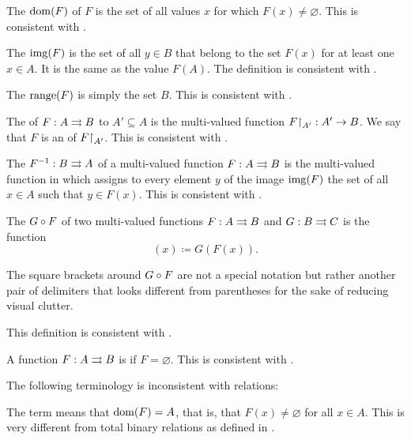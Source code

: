 \begin{definition}
\begin{thmenum}[resume=def:multi_valued_function]
     The  \( \operatorname{dom}(F) \) of \( F \) is the set of all values \( x \) for which \( F(x) \neq \varnothing \). This is consistent with .

     The  \( \operatorname{img}(F) \) is the set of all \( y \in B \) that belong to the set \( F(x) \) for at least one \( x \in A \). It is the same as the value \( F(A) \). The definition is consistent with .

     The  \( \operatorname{range}(F) \) is simply the set \( B \). This is consistent with .

     The  of \( F: A \rightrightarrows B \) to \( A' \subseteq A \) is the multi-valued function \( F{\upharpoonright}_{A'}: A' \rightarrow B \). We say that \( F \) is an  of \( F{\upharpoonright}_{A'} \). This is consistent with .

     The  \( F^{-1}: B \rightrightarrows A \) of a multi-valued function \( F: A \rightrightarrows B \) is the multi-valued function in which assigns to every element \( y \) of the image \( \operatorname{img}(F) \) the set of all \( x \in A \) such that \( y \in F(x) \). This is consistent with .

     The  \( G \mathbin \circ F \) of two multi-valued functions \( F: A \rightrightarrows B \) and \( G: B \rightrightarrows C \) is the function
    \begin{equation*}
      [G \bincirc F](x) \coloneqq G(F(x)).
    \end{equation*}

    The square brackets around \( G \mathbin \circ F \) are not a special notation but rather another pair of delimiters that looks different from parentheses for the sake of reducing visual clutter.

    This definition is consistent with .

     A function \( F: A \rightrightarrows B \) is  if \( F = \varnothing \). This is consistent with .
  \end{thmenum}

  The following terminology is inconsistent with relations:
  \begin{thmenum}[resume=def:multi_valued_function]
     The term  means that \( \operatorname{dom}(F) = A \), that is, that \( F(x) \neq \varnothing \) for all \( x \in A \). This is very different from total binary relations as defined in .


\end{thmenum}
\end{definition}
